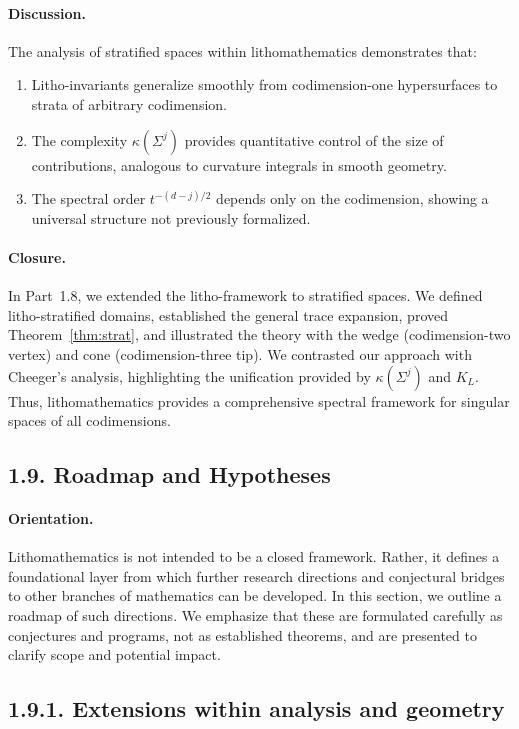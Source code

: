 \paragraph{Discussion.}
The analysis of stratified spaces within lithomathematics demonstrates that:
\begin{enumerate}
\item Litho-invariants generalize smoothly from codimension-one hypersurfaces
to strata of arbitrary codimension.
\item The complexity $\kappa(\Sigma^j)$ provides quantitative control of
the size of contributions, analogous to curvature integrals in smooth geometry.
\item The spectral order $t^{-(d-j)/2}$ depends only on the codimension,
showing a universal structure not previously formalized.
\end{enumerate}

\paragraph{Closure.}
In Part~1.8, we extended the litho-framework to stratified spaces.
We defined litho-stratified domains, established the general trace expansion,
proved Theorem~\ref{thm:strat}, and illustrated the theory with
the wedge (codimension-two vertex) and cone (codimension-three tip).
We contrasted our approach with Cheeger’s analysis,
highlighting the unification provided by $\kappa(\Sigma^j)$ and $K_L$.
Thus, lithomathematics provides a comprehensive spectral framework
for singular spaces of all codimensions.

\subsection*{1.9. Roadmap and Hypotheses}

\paragraph{Orientation.}
Lithomathematics is not intended to be a closed framework.
Rather, it defines a foundational layer from which further research directions
and conjectural bridges to other branches of mathematics can be developed.
In this section, we outline a roadmap of such directions.
We emphasize that these are formulated carefully as conjectures and programs,
not as established theorems, and are presented to clarify scope and potential impact.

\subsection*{1.9.1. Extensions within analysis and geometry}

